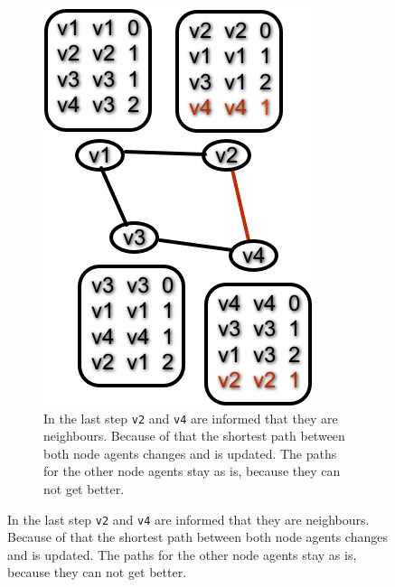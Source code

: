 \begin{figure}
\begin{subfigure}{.45\textwidth}
        \includegraphics[width=\textwidth] {images/dv5.png}
        \caption{In the last step \texttt{v2} and \texttt{v4} are informed that they are neighbours. Because of that the shortest path between both node agents changes and is updated. The paths for the other node agents stay as is, because they can not get better. }
    \end{subfigure}
\end{figure}

